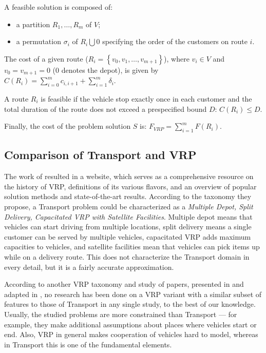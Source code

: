{A feasible solution is composed of:

\begin{itemize}
\item a partition ${R_{1}, \ldots, R_{m}}$ of ${V}$;
\item a permutation ${\sigma_{i}}$ of ${R_{i} \bigcup {0}}$ specifying the order of the customers on route ${i}$.
\end{itemize}


The cost of a given route (${R_{i} = \left\lbrace v_{0}, v_{1}, \ldots, v_{m+1} \right\rbrace}$), where ${v_{i} \in V}$ and ${v_{0} = v_{m+1} = 0}$ (0 denotes the depot), is given by ${C(R_{i}) = \sum_{i=0}^{m} c_{i,i+1} + \sum_{i=1}^{m} \delta_{i}}$.

A route ${R_{i}}$ is feasible if the vehicle stop exactly once in each customer and the total duration of the route does not exceed a prespecified bound ${D}$: ${C(R_{i}) \leq D}$.

Finally, the cost of the problem solution ${S}$ is: ${F_{VRP} = \sum_{i=1}^{m} F(R_{i})}$.
}

\subsection{Comparison of Transport and VRP}

The work of \citet{ResearchGroup2013} resulted in a website, which serves as a comprehensive resource on the history of VRP,
definitions of its various flavors, and an overview of popular solution methods and state-of-the-art results. According to the taxonomy they propose, a Transport problem could be characterized
as a \textit{Multiple Depot, Split Delivery, Capacitated VRP with Satellite Facilities}. Multiple depot
means that vehicles can start driving from multiple locations, split delivery
means a single customer can be served by multiple vehicles, capacitated VRP adds maximum
capacities to vehicles, and satellite facilities mean that vehicles can pick items up
while on a delivery route. This does not characterize the Transport domain in every detail, but it is a fairly accurate approximation.

According to another VRP taxonomy and study of papers, presented in \citet{Eksioglu2009} and adapted in \citet{Braekers2016}, no research has been done on a VRP variant with a similar subset of features to those of Transport in any single study, to the best of our knowledge.
Usually, the studied problems are more constrained than Transport --- for example, they make additional assumptions about places where vehicles start or end. Also, VRP in general
makes cooperation of vehicles hard to model, whereas in Transport this is one of the fundamental elements.

